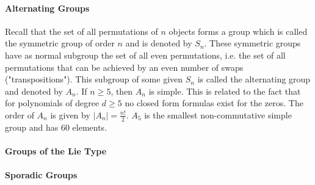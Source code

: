 \paragraph{Alternating Groups}
Recall that the set of all permutations of $n$ objects forms a group which is called the symmetric group of order $n$ and is denoted by $S_n$. These symmetric groups have as normal subgroup the set of all even permutations, i.e. the set of all permutations that can be achieved by an even number of swaps ("transpositions"). This subgroup of some given $S_n$ is called the alternating group and denoted by $A_n$. If $n \geq 5$, then $A_n$ is simple. This is related to the fact that for polynomials of degree $d \geq 5$ no closed form formulas exist for the zeros. The order of $A_n$ is given by $|A_n| = \frac{n !}{2}$. $A_5$ is the smallest non-commutative simple group and has 60 elements.


\paragraph{Groups of the Lie Type}


\paragraph{Sporadic Groups}








